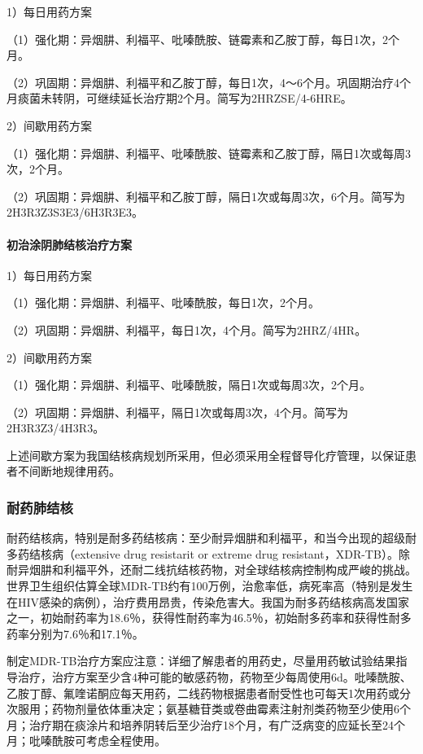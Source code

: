 1）每日用药方案

（1）强化期：异烟肼、利福平、吡嗪酰胺、链霉素和乙胺丁醇，每日1次，2个月。

（2）巩固期：异烟肼、利福平和乙胺丁醇，每日1次，4～6个月。巩固期治疗4个月痰菌未转阴，可继续延长治疗期2个月。简写为2HRZSE/4-6HRE。

2）间歇用药方案

（1）强化期：异烟肼、利福平、吡嗪酰胺、链霉素和乙胺丁醇，隔日1次或每周3次，2个月。

（2）巩固期：异烟肼、利福平和乙胺丁醇，隔日1次或每周3次，6个月。简写为2H3R3Z3S3E3/6H3R3E3。
\paragraph{初治涂阴肺结核治疗方案}

1）每日用药方案

（1）强化期：异烟肼、利福平、吡嗪酰胺，每日1次，2个月。

（2）巩固期：异烟肼、利福平，每日1次，4个月。简写为2HRZ/4HR。

2）间歇用药方案

（1）强化期：异烟肼、利福平、吡嗪酰胺，隔日1次或每周3次，2个月。

（2）巩固期：异烟肼、利福平，隔日1次或每周3次，4个月。简写为2H3R3Z3/4H3R3。

上述间歇方案为我国结核病规划所采用，但必须采用全程督导化疗管理，以保证患者不间断地规律用药。

\subsubsection{耐药肺结核}

耐药结核病，特别是耐多药结核病：至少耐异烟肼和利福平，和当今出现的超级耐多药结核病（extensive
drug resistarit or extreme drug
resistant，XDR-TB）。除耐异烟肼和利福平外，还耐二线抗结核药物，对全球结核病控制构成严峻的挑战。世界卫生组织估算全球MDR-TB约有100万例，治愈率低，病死率高（特别是发生在HIV感染的病例），治疗费用昂贵，传染危害大。我国为耐多药结核病高发国家之一，初始耐药率为18.6％，获得性耐药率为46.5％，初始耐多药率和获得性耐多药率分别为7.6％和17.1％。

制定MDR-TB治疗方案应注意：详细了解患者的用药史，尽量用药敏试验结果指导治疗，治疗方案至少含4种可能的敏感药物，药物至少每周使用6d。吡嗪酰胺、乙胺丁醇、氟喹诺酮应每天用药，二线药物根据患者耐受性也可每天1次用药或分次服用；药物剂量依体重决定；氨基糖苷类或卷曲霉素注射剂类药物至少使用6个月；治疗期在痰涂片和培养阴转后至少治疗18个月，有广泛病变的应延长至24个月；吡嗪酰胺可考虑全程使用。

